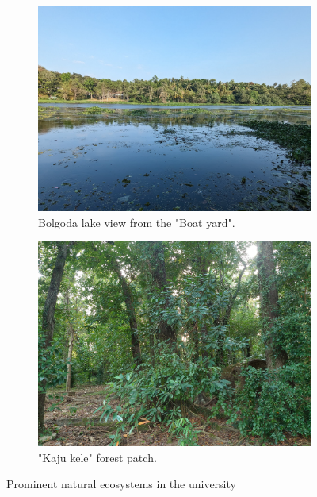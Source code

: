 \begin{figure}[!htpb]
    \centering
    \begin{subfigure}{0.45\textwidth}
        \includegraphics[width=\textwidth]{Figures/bolgoda.jpg}
        \caption{Bolgoda lake view from the "Boat yard".}
        \label{fig:figure-02.1}
    \end{subfigure}
    \hspace{.5cm} %
    \begin{subfigure}{0.45\textwidth}
        \includegraphics[width=\textwidth]{Figures/kajuKele.jpg}
        \caption{"Kaju kele" forest patch.}
        \label{fig:figure-02.2}
    \end{subfigure}
    \caption{Prominent natural ecosystems in the university}
    \label{fig:figure-02}
\end{figure}

